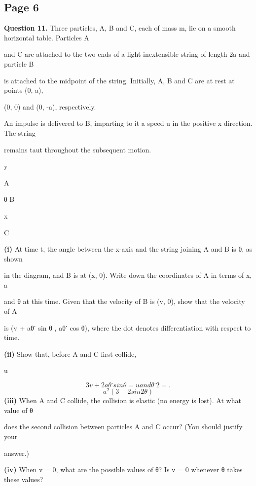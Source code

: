\documentclass[12pt]{article}
\begin{document}
\subsection*{Page 6}
\begin{flushleft}
\bigskip\textbf{Question 11.} Three particles, A, B and C, each of mass m, lie on a smooth horizontal table. Particles A\par
and C are attached to the two ends of a light inextensible string of length 2a and particle B\par
is attached to the midpoint of the string. Initially, A, B and C are at rest at points (0, a),\par
(0, 0) and (0, -a), respectively.\par
An impulse is delivered to B, imparting to it a speed u in the positive x direction. The string\par
remains taut throughout the subsequent motion.\par
y\par
A\par
θ B\par
x\par
C\par
\textbf{(i)} At time t, the angle between the x-axis and the string joining A and B is θ, as shown\par
in the diagram, and B is at (x, 0). Write down the coordinates of A in terms of x, a\par
and θ at this time. Given that the velocity of B is (v, 0), show that the velocity of A\par
is (v + aθ˙ sin θ , aθ˙ cos θ), where the dot denotes differentiation with respect to time.\par
\textbf{(ii)} Show that, before A and C first collide,\par
u\par
\[3v + 2aθ˙ sin θ = u and θ˙2 = .\]
\[a^2(3 - 2 sin 2 θ)\]
\textbf{(iii)} When A and C collide, the collision is elastic (no energy is lost). At what value of θ\par
does the second collision between particles A and C occur? (You should justify your\par
answer.)\par
\textbf{(iv)} When v = 0, what are the possible values of θ? Is v = 0 whenever θ takes these values?\par
\end{flushleft}
\end{document}
